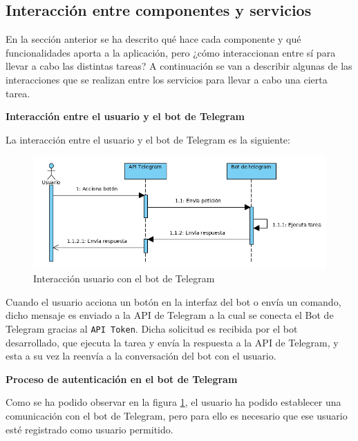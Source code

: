 


\pagestyle{miEstilo503}


\subsection{Interacción entre componentes y servicios} \label{sec:interac}

En la sección anterior se ha descrito qué hace cada componente y qué funcionalidades aporta a la aplicación, pero ¿cómo interaccionan entre sí para llevar a cabo las distintas tareas? A continuación se van a describir algunas de las interacciones que se realizan entre los servicios para llevar a cabo una cierta tarea.

\textbf{Interacción entre el usuario y el bot de Telegram}

La interacción entre el usuario y el bot de Telegram es la siguiente:

\begin{figure}[H]
	\centering
	\includegraphics[scale=0.6]{images/84}
	\caption{Interacción usuario con el bot de Telegram}
	\label{f:1}
\end{figure}

Cuando el usuario acciona un botón en la interfaz del bot o envía un comando, dicho mensaje es enviado a la API de Telegram a la cual se conecta el Bot de Telegram gracias al \texttt{API Token}. Dicha solicitud es recibida por el bot desarrollado, que ejecuta la tarea y envía la respuesta a la API de Telegram, y esta a su vez la reenvía a la conversación del bot con el usuario.

\textbf{Proceso de autenticación en el bot de Telegram}

Como se ha podido observar en la figura \ref{f:1}, el usuario ha podido establecer una comunicación con el bot de Telegram, pero para ello es necesario que ese usuario esté registrado como usuario permitido.

